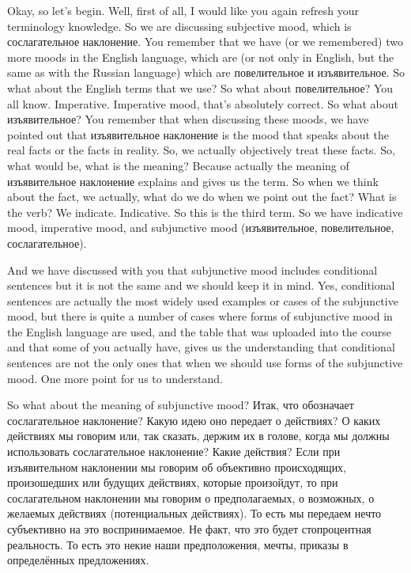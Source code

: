 \documentclass[main.tex]{subfiles}
\begin{document}
Okay, so let's begin.
Well, first of all, I would like you again refresh your terminology knowledge.
So we are discussing subjective mood, which is сослагательное наклонение.
You remember that we have (or we remembered) two more moods in the English language, which are (or not only in English, but the same as with the Russian language) which are повелительное и изъявительное.
So what about the English terms that we use?
So what about повелительное? You all know.
Imperative.
Imperative mood, that's absolutely correct.
So what about изъявительное?
You remember that when discussing these moods, we have pointed out that изъявительное наклонение is the mood that speaks about the real facts or the facts in reality.
So, we actually objectively treat these facts.
So, what would be, what is the meaning?
Because actually the meaning of изъявительное наклонение explains and gives us the term.
So when we think about the fact, we actually, what do we do when we point out the fact?
What is the verb?
We indicate.
Indicative.
So this is the third term.
So we have indicative mood, imperative mood, and subjunctive mood (изъявительное, повелительное, сослагательное).

And we have discussed with you that subjunctive mood includes conditional sentences but it is not the same and we should keep it in mind.
Yes, conditional sentences are actually the most widely used examples or cases of the subjunctive mood, but there is quite a number of cases where forms of subjunctive mood in the English language are used, and the table that was uploaded into the course and that some of you actually have, gives us the understanding that conditional sentences are not the only ones that when we should use forms of the subjunctive mood.
One more point for us to understand.

So what about the meaning of subjunctive mood?
Итак, что обозначает сослагательное наклонение?
Какую идею оно передает о действиях?
О каких действиях мы говорим или, так сказать, держим их в голове, когда мы должны использовать сослагательное наклонение?
Какие действия?
Если при изъявительном наклонении мы говорим об объективно происходящих, произошедших или будущих действиях, которые произойдут, то при сослагательном наклонении мы говорим о предполагаемых, о возможных, о желаемых действиях (потенциальных действиях).
То есть мы передаем нечто субъективно на это воспринимаемое.
Не факт, что это будет стопроцентная реальность.
То есть это некие наши предположения, мечты, приказы в определённых предложениях.
\end{document}
